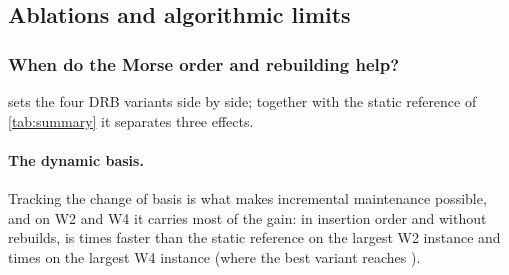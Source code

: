 \subsection{Ablations and algorithmic limits}\label{sec:exp-ablation-limits}

\subsubsection{When do the Morse order and rebuilding help?}\label{sec:exp-ablation}

 sets the four DRB variants side by side; together with the
static reference of \cref{tab:summary} it separates three effects.

\begin{table}[t]
  \centering
  \caption{The four DRB variants: amortised latency in ms (three runs pooled).
    Bold: fastest; $^{\circ}$: within noise of the fastest. Rebuilds: mean
    number per run of  /  under the default
    policy. The parameter sweep of the policy: Section~\ref{S-sec:s-rebuild}.}
  \label{tab:ablation}
  \small
\end{table}

\paragraph{The dynamic basis.}
Tracking the change of basis is what makes incremental maintenance possible,
and on W2 and W4 it carries most of the gain: in insertion order and without
rebuilds,  is \NumWTwoNThirtyThreeSEightDrbIdSpeedupFullSorted{}
times faster than the static reference on the largest W2 instance and
\NumWFourPlaneNSixteenThousandDTwoDrbIdSpeedupFullId{} times on the largest W4
instance (where the best variant reaches
\NumWFourPlaneNSixteenThousandDTwoMmhmNorbSpeedupFullId).

